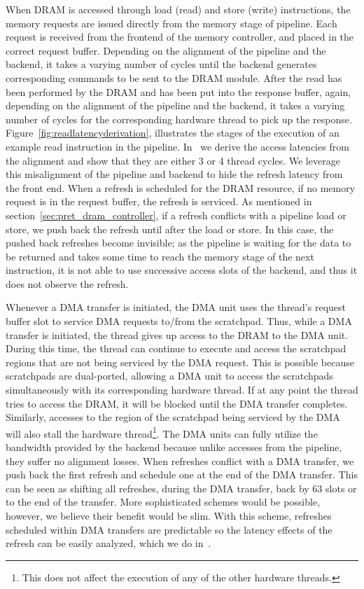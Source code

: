 When DRAM is accessed through load (read) and store (write) instructions, the memory requests are issued directly from the memory stage of pipeline.
Each request is received from the frontend of the memory controller, and placed in the correct request buffer. 
Depending on the alignment of the pipeline and the backend, it takes a varying number of cycles until the backend generates corresponding commands to be sent to the DRAM module.
After the read has been performed by the DRAM and has been put into the response buffer, again, depending on the alignment of the pipeline and the backend, it takes a varying number of cycles for the corresponding hardware thread to pick up the response.
Figure~\ref{fig:readlatencyderivation}, illustrates the stages of the execution of an example read instruction in the pipeline.
In~\cite{ReinekeLiuPatelKimLee11_PRETDRAMControllerBankPrivatizationForPredictability} we derive the access latencies from the alignment and show that they are either 3 or 4 thread cycles.    
We leverage this misalignment of the pipeline and backend to hide the refresh latency from the front end. 
When a refresh is scheduled for the DRAM resource, if no memory request is in the request buffer, the refresh is serviced.
As mentioned in section~\ref{sec:pret_dram_controller}, if a refresh conflicts with a pipeline load or store, we push back the refresh until after the load or store. 
In this case, the pushed back refreshes become invisible;   
as the pipeline is waiting for the data to be returned and takes some time to reach the memory stage of the next instruction, it is not able to use successive access slots of the backend, and thus it does not observe the refresh.

Whenever a DMA transfer is initiated, the DMA unit uses the thread's request buffer slot to service DMA requests to/from the scratchpad. 
Thus, while a DMA transfer is initiated, the thread gives up access to the DRAM to the DMA unit.
During this time, the thread can continue to execute and access the scratchpad regions that are not being serviced by the DMA request. 
This is possible because scratchpads are dual-ported, allowing a DMA unit to access the scratchpads simultaneously with its corresponding hardware thread.
If at any point the thread tries to access the DRAM, it will be blocked until the DMA transfer completes.
Similarly, accesses to the region of the scratchpad being serviced by the DMA will also stall the hardware thread\footnote{This does not affect the execution of any of the other hardware threads.}.
The DMA units can fully utilize the bandwidth provided by the backend because unlike accesses from the pipeline, they suffer no alignment losses.
When refreshes conflict with a DMA transfer, we push back the first refresh and schedule one at the end of the DMA transfer. 
This can be seen as shifting all refreshes, during the DMA transfer, back by $63$ slots or to the end of the transfer.
More sophisticated schemes would be possible, however, we believe their benefit would be slim.
With this scheme, refreshes scheduled within DMA transfers are predictable so the latency effects of the refresh can be easily analyzed, which we do in~\cite{ReinekeLiuPatelKimLee11_PRETDRAMControllerBankPrivatizationForPredictability}.

